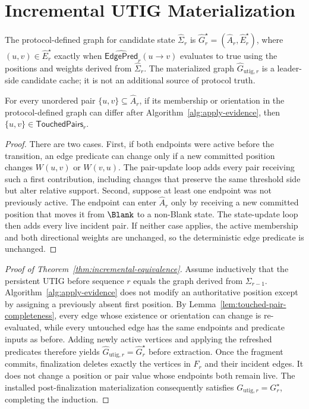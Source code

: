 \section{Incremental UTIG Materialization}
\label{app:incremental-materialization}

The protocol-defined graph for candidate state $\widehat\Sigma_r$ is
$\widehat G_r^\star=(\widehat A_r,\widehat E_r^\star)$, where
$(u,v)\in\widehat E_r^\star$ exactly when
$\widehat{\mathsf{EdgePred}}_r(u\to v)$ evaluates to true using the positions and
weights derived from $\widehat\Sigma_r$.  The materialized graph
$\widehat G_{\mathrm{utig},r}$ is a leader-side candidate cache; it is not an
additional source of protocol truth.

\begin{lemma}
\label{lem:touched-pair-completeness}
For every unordered pair $\{u,v\}\subseteq\widehat A_r$, if its membership or
orientation in the protocol-defined graph can differ after
Algorithm~\ref{alg:apply-evidence}, then
$\{u,v\}\in\mathsf{TouchedPairs}_r$.
\end{lemma}

\begin{proof}
There are two cases.  First, if both endpoints were active before the
transition, an edge predicate can change only if a new committed position
changes $W(u,v)$ or $W(v,u)$.  The pair-update loop adds every pair receiving
such a first contribution, including changes that preserve the same threshold
side but alter relative support.  Second, suppose at least one endpoint was
not previously active.  The endpoint can enter $\widehat A_r$ only by receiving
a new committed position that moves it from $\Blank$ to a non-Blank state.
The state-update loop then adds every live incident pair.  If neither case
applies, the active membership and both directional weights are unchanged, so
the deterministic edge predicate is unchanged.
\end{proof}

\begin{proof}[Proof of Theorem~\ref{thm:incremental-equivalence}]
Assume inductively that the persistent UTIG before sequence $r$ equals the graph
derived from $\Sigma_{r-1}$.  Algorithm~\ref{alg:apply-evidence} does not modify
an authoritative position except by assigning a previously absent first
position.  By Lemma~\ref{lem:touched-pair-completeness}, every edge whose
existence or orientation can change is re-evaluated, while every untouched
edge has the same endpoints and predicate inputs as before.  Adding newly
active vertices and applying the refreshed predicates therefore yields
$\widehat G_{\mathrm{utig},r}=\widehat G_r^\star$ before extraction.  Once the
fragment commits,
finalization deletes exactly the vertices in $F_r$ and their incident edges.
It does not change a position or pair value whose endpoints both remain live.
The installed post-finalization materialization consequently satisfies
$G_{\mathrm{utig},r}=G_r^\star$, completing the induction.
\end{proof}

